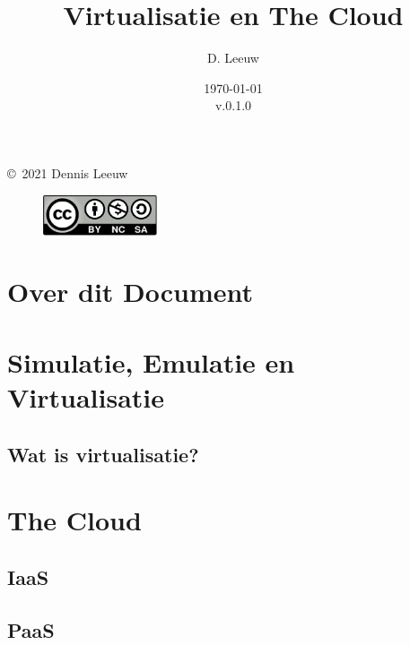 \documentclass[a4paper,12pt,twoside,openright,titlepage]{book}
\author{D. Leeuw}
\title{Virtualisatie en The Cloud}
\date{\today\\v.0.1.0}
\begin{document}

\maketitle

\copyright\ 2021 Dennis Leeuw\\

\begin{figure}[H]
\includegraphics[width=0.3\textwidth]{CC-BY-SA-NC.png}
\end{figure}

\bigskip




\frontmatter
\chapter{Over dit Document}



\tableofcontents

\mainmatter
\chapter{Simulatie, Emulatie en Virtualisatie}

\section{Wat is virtualisatie?}


\chapter{The Cloud}

\section{IaaS}

\section{PaaS}

\end{document}
